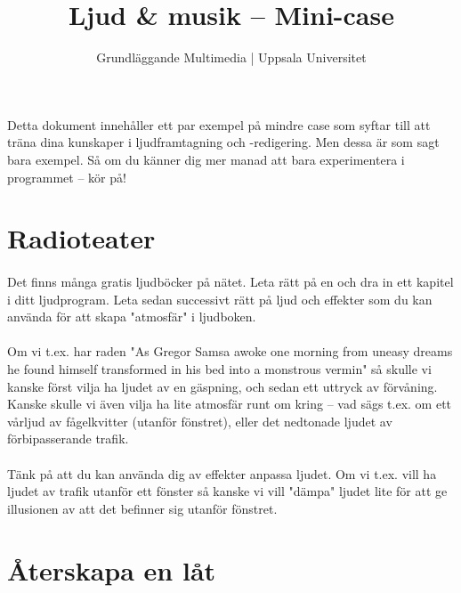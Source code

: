 \documentclass{article}
\begin{document}
  \title{ Ljud \& musik -- Mini-case }
  \author{ Grundläggande Multimedia | Uppsala Universitet }
  \date{}
  \maketitle

  \paragraph{}
  Detta dokument innehåller ett par exempel på mindre case som syftar till att träna dina kunskaper i ljudframtagning och -redigering. Men dessa är som sagt bara exempel. Så om du känner dig mer manad att bara experimentera i programmet -- kör på!


  \newpage
  \section{ Radioteater }
    \paragraph{}
    Det finns många gratis ljudböcker på nätet. Leta rätt på en och dra in ett kapitel i ditt ljudprogram. Leta sedan successivt rätt på ljud och effekter som du kan använda för att skapa "atmosfär" i ljudboken.
    \paragraph{}
    Om vi t.ex. har raden "As Gregor Samsa awoke one morning from uneasy dreams he found himself transformed in his bed into a monstrous vermin" så skulle vi kanske först vilja ha ljudet av en gäspning, och sedan ett uttryck av förvåning. Kanske skulle vi även vilja ha lite atmosfär runt om kring -- vad sägs t.ex. om ett vårljud av fågelkvitter (utanför fönstret), eller det nedtonade ljudet av förbipasserande trafik.
    \paragraph{}
    Tänk på att du kan använda dig av effekter anpassa ljudet. Om vi t.ex. vill ha ljudet av trafik utanför ett fönster så kanske vi vill "dämpa" ljudet lite för att ge illusionen av att det befinner sig utanför fönstret.



  \section{ Återskapa en låt }
\end{document}
